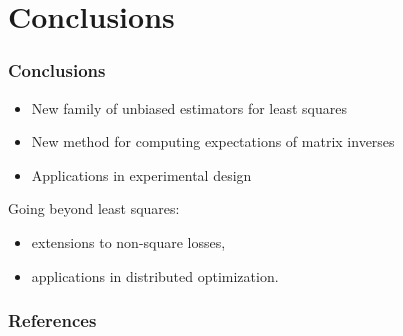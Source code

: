 \documentclass{beamer}
\begin{document}
\section{Conclusions}

\begin{frame}
  \frametitle{Conclusions}
  \begin{itemize}
  \item New family of unbiased estimators for least squares
  \item New method for computing expectations of matrix inverses
  \item Applications in experimental design
  \end{itemize}
  \pause\vspace{3mm}
  
Going beyond least squares:
  \begin{itemize}
  \item extensions to non-square losses,
  \item applications in distributed optimization.
  \end{itemize}
\end{frame}

\begin{frame}[allowframebreaks]
  \frametitle{References}
  \scriptsize 
  
  
\end{frame}
\end{document}
